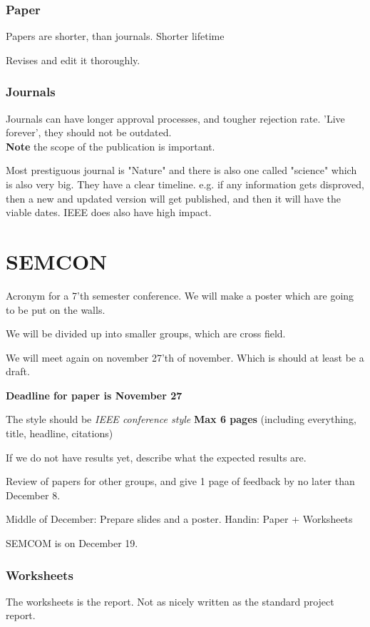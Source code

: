 \documentclass[a4paper]{article}
\begin{document}
\subsubsection{Paper}
Papers are shorter, than journals.
Shorter lifetime

Revises and edit it thoroughly.

\subsubsection{Journals}
Journals can have longer approval processes, and tougher rejection rate. 
'Live forever', they should not be outdated. \\
\textbf{Note} the scope of the publication is important. 

Most prestiguous journal is "Nature" and there is also one called "science" which is also very big.
They have a clear timeline. e.g. if any information gets disproved, then a new and updated version will get published, and then it will have the viable dates.
IEEE does also have high impact.


\section{SEMCON}
Acronym for a 7'th semester conference.
We will make a poster which are going to be put on the walls.

We will be divided up into smaller groups, which are cross field. 

We will meet again on november 27'th of november. Which is should at least be a draft. 

\textbf{Deadline for paper is November 27} 

The style should be \textit{ IEEE conference style} 
\textbf{Max 6 pages} (including everything, title, headline, citations)

If we do not have results yet, describe what the expected results are.

Review of papers for other groups, and give 1 page of feedback by no later than December 8.

Middle of December: Prepare slides and a poster.
Handin: Paper + Worksheets

SEMCOM is on December 19.
\subsubsection{Worksheets}

The worksheets is the report. Not as nicely written as the standard project report.
\end{document}
